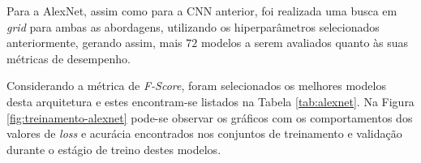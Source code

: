 
Para a AlexNet, assim como para a CNN anterior, foi realizada uma busca em \emph{grid} para ambas as abordagens, utilizando os hiperparâmetros selecionados anteriormente, gerando assim, mais $72$ modelos a serem avaliados quanto às suas métricas de desempenho.

Considerando a métrica de \emph{F-Score}, foram selecionados os melhores modelos  desta arquitetura e estes encontram-se listados na Tabela \ref{tab:alexnet}. Na Figura \ref{fig:treinamento-alexnet} pode-se observar os gráficos com os comportamentos dos valores de \emph{loss} e acurácia encontrados nos conjuntos de treinamento e validação durante o estágio de treino destes modelos.

\begin{table}[h!]
\centering
\caption{Detalhamento dos melhores modelos obtidos com a arquitetura AlexNet para cada uma das abordagens consideradas neste trabalho.}
\label{tab:alexnet}
\end{table}

